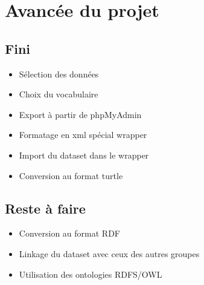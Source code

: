 \documentclass[12pt,a4paper]{article}
\begin{document}
	\section{Avancée du projet}
	\subsection{Fini}
		\begin{itemize}		
			\item{Sélection des données}
			\item{Choix du vocabulaire}
			\item{Export à partir de phpMyAdmin}
			\item{Formatage en xml spécial wrapper}
			\item{Import du dataset dans le wrapper}
			\item{Conversion au format turtle}
		\end{itemize}
	\subsection{Reste à faire}
		\begin{itemize}
			\item{Conversion au format RDF}
			\item{Linkage du dataset avec ceux des autres groupes}
			\item{Utilisation des ontologies RDFS/OWL}
		\end{itemize}
\end{document}
